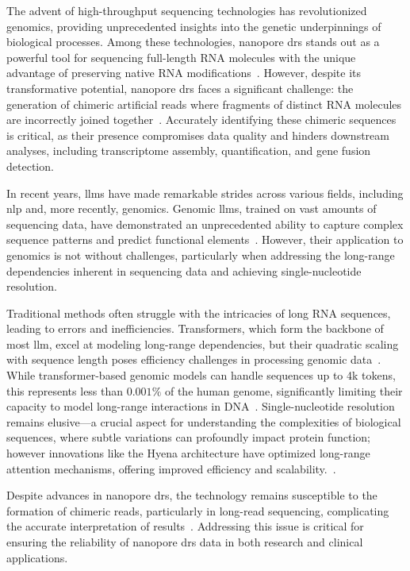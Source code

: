 \documentclass[pdflatex, sn-mathphys-num, lineno]{sn-jnl}%
\theoremstyle{thmstyleone}%
\theoremstyle{thmstyletwo}%
\theoremstyle{thmstylethree}%
\begin{document}
The advent of high-throughput sequencing technologies has revolutionized genomics, providing unprecedented insights into the genetic underpinnings of biological processes.
Among these technologies, nanopore \gls{drs} stands out as a powerful tool for sequencing full-length RNA molecules with the unique advantage of preserving native RNA modifications~\cite{garalde2018highly, jain2022advances}.
However, despite its transformative potential, nanopore \gls{drs} faces a significant challenge: the generation of chimeric artificial reads where fragments of distinct RNA molecules are incorrectly joined together~\cite{smith2020molecular}.
Accurately identifying these chimeric sequences is critical, as their presence compromises data quality and hinders downstream analyses, including transcriptome assembly, quantification, and gene fusion detection.

In recent years, \glspl{llm} have made remarkable strides across various fields, including \gls{nlp} and, more recently, genomics.
Genomic \glspl{llm}, trained on vast amounts of sequencing data, have demonstrated an unprecedented ability to capture complex sequence patterns and predict functional elements~\cite{dalla2023nucleotide, zhou2023dnabert2}.
However, their application to genomics is not without challenges, particularly when addressing the long-range dependencies inherent in sequencing data and achieving single-nucleotide resolution.

Traditional methods  often struggle with the intricacies of long RNA sequences, leading to errors and inefficiencies.
Transformers, which form the backbone of most \gls{llm}, excel at modeling long-range dependencies, but their quadratic scaling with sequence length poses efficiency challenges in processing genomic data~\cite{tay2022efficient}.
While transformer-based genomic models can handle sequences up to 4k tokens, this represents less than $0.001\%$ of the human genome, significantly limiting their capacity to model long-range interactions in DNA~\cite{dalla2023nucleotide, zhou2023dnabert2, ji2021dnabert, nguyen2024hyenadna}.
Single-nucleotide resolution remains elusive—a crucial aspect for understanding the complexities of biological sequences, where subtle variations can profoundly impact protein function; however innovations like the Hyena architecture have optimized long-range attention mechanisms, offering improved efficiency and scalability.~\cite{poli2023hyena, nguyen2024hyenadna}.

Despite advances in nanopore \gls{drs}, the technology remains susceptible to the formation of chimeric reads, particularly in long-read sequencing, complicating the accurate interpretation of results~\cite{smith2020molecular}.
Addressing this issue is critical for ensuring the reliability of nanopore \gls{drs} data in both research and clinical applications.
\end{document}

